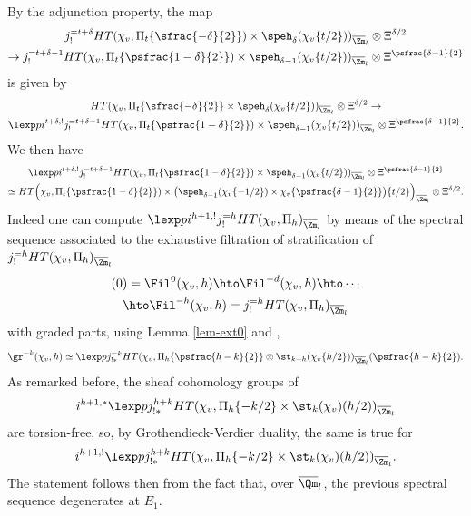 By the adjunction property, the map
\begin{multline} \label{eq-map1}
j_!^{=t+\delta} HT(\chi_{v},\Pi_t \{\sfrac{-\delta}{2}\}) \times \speh_{\delta}
(\chi_{v}\{t/2\}))_{\overline \Zm_l} \otimes \Xi^{\delta/2} \\
\to j_!^{=t+\delta-1} HT(\chi_{v},\Pi_t \{\psfrac{1-\delta}{2}\}) \times
\speh_{\delta-1}(\chi_{v}\{t/2\}))_{\overline \Zm_l} \otimes \Xi^{\psfrac{\delta-1}{2}}
\end{multline}
is given by
\begin{multline}\label{eq-map2}
HT(\chi_{v},\Pi_t \{\sfrac{-\delta}{2}\} \times \speh_{\delta}(\chi_{v}\{t/2\}))_{\overline \Zm_l}
\otimes \Xi^{\delta/2} \to \\
\lexp p i^{t+\delta,!} j_!^{=t+\delta-1} HT(\chi_{v},\Pi_t \{\psfrac{1-\delta}{2}\}) \times
\speh_{\delta-1}(\chi_{v}\{t/2\}))_{\overline \Zm_l} \otimes \Xi^{\psfrac{\delta-1}{2}}.
\end{multline}
We then have
\begin{multline} \label{eq-map3}
\lexp p i^{t+\delta,!} j_!^{=t+\delta-1} HT(\chi_{v},\Pi_t \{\psfrac{1-\delta}{2}\}) \times
\speh_{\delta-1}(\chi_{v}\{t/2\}))_{\overline \Zm_l} \otimes \Xi^{\psfrac{\delta-1}{2}} \\ \simeq
HT \Bigl (\chi_{v}, \Pi_t \{\psfrac{1-\delta}{2}\}) \times \bigl (\speh_{\delta-1}(\chi_{v} \{-1/2\})
\times \chi_{v} \{\psfrac{\delta-1}{2}\} \bigr) \{t/2\} \Bigr)_{\overline \Zm_l} \otimes \Xi^{\delta/2}.
\end{multline}
Indeed one can compute $\lexp p i^{h+1,!} j_{!}^{=h} HT(\chi_v,\Pi_h)_{\overline \Zm_l}$ by means of
the spectral sequence associated to the exhaustive filtration of stratification of
$j_{!}^{=h} HT(\chi_v,\Pi_h)_{\overline \Zm_l}$
\begin{multline} \label{eq-filj}
(0)=\Fil^0(\chi_{v},h) \hto \Fil^{-d}(\chi_{v},h) \hto \cdots
\\
\hto \Fil^{-h}(\chi_{v},h)=j^{=h}_{!} HT(\chi_{v},\Pi_h)_{\overline \Zm_l}
\end{multline}
with graded parts, using Lemma \ref{lem-ext0} and \cite{boyer-torsion},
\[
\gr^{-k}(\chi_{v},h) \simeq \lexp p j^{=k}_{!*}
HT(\chi_{v},\Pi_h \{\psfrac{h-k}{2}\} \otimes \st_{k-h}(\chi_{v}\{h/2\}))_{\overline \Zm_l}(\psfrac{h-k}{2}).
\]
As remarked before, the sheaf cohomology groups of
\[
i^{h+1,*} \lexp p j_{!*}^{h+k} HT(\chi_v,\Pi_h \{-k/2\} \times \st_k(\chi_v)(h/2))_{\overline \Zm_l}
\]
are torsion-free, so, by Grothendieck-Verdier duality, the same is true for
\[
i^{h+1,!} \lexp p j_{!*}^{h+k} HT(\chi_v,\Pi_h \{-k/2\}\times \st_k(\chi_v)(h/2))_{\overline \Zm_l}.
\]
The statement follows then from the fact that, over
$\overline \Qm_l$, the previous spectral sequence degenerates at $E_1$.

